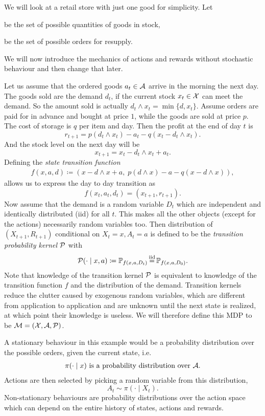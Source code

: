 \begin{example}\label{example: inventory mgmt} We will look at a retail store with just one good for simplicity. Let
	\begin{description}[noitemsep]
		\item[\(\cX\coloneqq\N\)] be the set of possible quantities of goods in stock,
		\item[\(\cA\coloneqq\N\)] be the set of possible orders for resupply.
	\end{description}
	We will now introduce the mechanics of actions and rewards without stochastic behaviour and then change that later.

	Let us assume that the ordered goods \(a_t\in\mathcal{A}\) arrive in the morning the next day. The goods sold are the demand \(d_t\), if the current stock \(x_t\in\mathcal{X}\) can meet the demand. So the amount sold is actually \(d_t\wedge x_t = \min\{d,x_t\}\). Assume orders are paid for in advance and bought at price \(1\), while the goods are sold at price \(p\). The cost of storage is \(q\) per item and day. Then the profit at the end of day \(t\) is
	\[
		r_{t+1}= p (d_t\wedge x_t)-a_t-q(x_t - d_t\wedge x_t).
	\]
	And the stock level on the next day will be
	\[
		x_{t+1}=x_t - d_t\wedge x_t + a_t.
	\]
	Defining the \emph{state transition function}
	\begin{align*}
		f(x,a,d)\coloneqq \left(x-d\wedge x + a,\; p(d\wedge x) - a - q(x - d\wedge x)\right),
	\end{align*}
	allows us to express the day to day transition as
	\[
		f(x_t,a_t,d_t)=(x_{t+1}, r_{t+1}).
	\]
	Now assume that the demand is a random variable \(D_t\) which are independent and identically distributed (iid) for all \(t\). This makes all the other objects (except for the actions) necessarily random variables too. Then distribution of \((X_{t+1},R_{t+1})\) conditional on \(X_t=x, A_t=a\) is defined to be the \emph{transition probability kernel} \(\mathcal{P}\) with
	\begin{align*}
		\cP(\cdot \mid x, a)\coloneqq\Pr_{f(x,a,D_t)}\xeq{\text{iid}} \Pr_{f(x,a,D_0)}.
	\end{align*}
	Note that knowledge of the transition kernel \(\mathcal{P}\) is equivalent to knowledge of the transition function \(f\) and the distribution of the demand. Transition kernels reduce the clutter caused by exogenous random variables, which are different from application to application and are unknown until the next state is realized, at which point their knowledge is useless. We will therefore define this MDP to be \(\mathcal{M}=(\mathcal{X},\mathcal{A},\mathcal{P})\).

	A stationary behaviour in this example would be a probability distribution over the possible orders, given the current state, i.e.
	\begin{align*}
		\pi(\cdot \mid x) \text{ is a probability distribution over }\mathcal{A}.
	\end{align*}
	Actions are then selected by picking a random variable from this distribution,
	\[
		A_t \sim \pi(\cdot \mid X_t).
	\]
	Non-stationary behaviours are probability distributions over the action space which can depend on the entire history of states, actions and rewards. 
\end{example}

